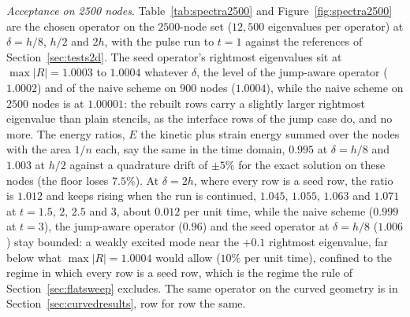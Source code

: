\documentclass[11pt]{amsart}
\theoremstyle{definition}
\theoremstyle{remark}
\newcommand{\para}[1]{\par\smallskip\noindent\textit{#1}.\enspace}
\newcommand{\sci}[2]{\ensuremath{#1 \times 10^{#2}}}
\newcommand{\tablesetup}{\footnotesize\setlength{\tabcolsep}{2.5pt}%
  \renewcommand{\sci}[2]{\ensuremath{##1{\times}10^{##2}}}}
\begin{document}
\para{Acceptance on 2500 nodes}
Table~\ref{tab:spectra2500} and Figure~\ref{fig:spectra2500} are the
chosen operator on the $2500$-node set ($12{,}500$ eigenvalues per
operator) at $\delta = h / 8$, $h / 2$ and $2h$, with the pulse run to
$t = 1$ against the references of Section~\ref{sec:tests2d}. The seed
operator's rightmost eigenvalues sit at $\max |R| = 1.0003$ to $1.0004$
whatever $\delta$, the level of the jump-aware operator ($1.0002$) and of
the naive scheme on $900$ nodes ($1.0004$), while the naive scheme on
$2500$ nodes is at $1.00001$: the rebuilt rows carry a slightly larger
rightmost eigenvalue than plain stencils, as the interface rows of the
jump case do, and no more. The energy ratios, $E$ the kinetic plus strain energy summed over the
nodes with the area $1 / n$ each, say the same in the time domain, $0.995$ at $\delta = h / 8$ and $1.003$ at $h / 2$ against a
quadrature drift of $\pm 5\%$ for the exact solution on these nodes (the
floor loses $7.5\%$). At $\delta = 2h$, where every row is a seed row, the
ratio is $1.012$ and keeps rising when the run is continued, $1.045$,
$1.055$, $1.063$ and $1.071$ at $t = 1.5$, $2$, $2.5$ and $3$, about
$0.012$ per unit time, while the naive scheme ($0.999$ at $t = 3$), the
jump-aware operator ($0.96$) and the seed operator at $\delta = h / 8$
($1.006$) stay bounded: a weakly excited mode near the $+0.1$ rightmost
eigenvalue, far below what $\max |R| = 1.0004$ would allow ($10\%$ per
unit time), confined to the regime in which every row is a seed row,
which is the regime the rule of Section~\ref{sec:flatsweep} excludes.
The same operator on the curved geometry is in
Section~\ref{sec:curvedresults}, row for row the same.

\begin{table}
  \caption{The chosen operator on the $2500$-node flat set at three edge
  widths, against the naive scheme, the interface-aware operator at the
  jump and the uniform-medium floor: rebuilt rows, the spectrum's largest
  real part with the hyperviscosity in, the largest RK4 amplification,
  the energy ratio $E(1) / E(0)$ of the run, its largest spurious $|u|$
  and its error in $v$.}
  \label{tab:spectra2500}
  \centering
  \tablesetup
  \resizebox{\textwidth}{!}{}
\end{table}
\end{document}
